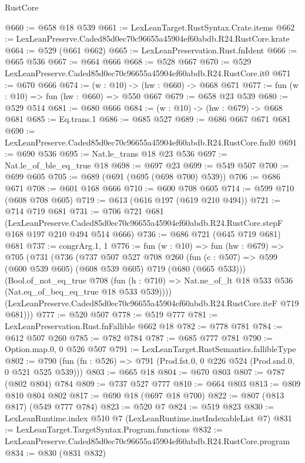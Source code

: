 \begin{lexlean}{RustCore}
\begin{coremodule}
@660 := @658 @18 @539
@661 := LexLeanTarget.RustSyntax.Crate.items
@662 := LexLeanPreserve.Caded85d0ec70c96655a45904ef60abdb.R24.RustCore.krate
@664 := @529 (@661 @662)
@665 := LexLeanPreservation.Rust.fnIdent
@666 := @665 @536
@667 := @664 @666
@668 := @528 @667
@670 := @529 LexLeanPreserve.Caded85d0ec70c96655a45904ef60abdb.R24.RustCore.it0
@671 := @670 @666
@674 := (w : @10) -> (hw : @660) -> @668 @671
@677 := fun (w : @10) => fun (hw : @660) => @550 @667
@679 := @658 @23 @539
@680 := @529 @514
@681 := @680 @666
@684 := (w : @10) -> (hw : @679) -> @668 @681
@685 := Eq.trans.{1}
@686 := @685 @527
@689 := @686 @667 @671 @681
@690 := LexLeanPreserve.Caded85d0ec70c96655a45904ef60abdb.R24.RustCore.fnd0
@691 := @690 @536
@695 := Nat.le_trans @18 @23 @536
@697 := Nat.le_of_ble_eq_true @18
@698 := @697 @23
@699 := @549 @507
@700 := @699 @605
@705 := @689 (@691 (@695 (@698 @700) @539))
@706 := @686 @671
@708 := @601 @168 @666
@710 := @600 @708 @605
@714 := @599 @710 (@608 @708 @605)
@719 := @613 (@616 @197 (@619 @210 @494))
@721 := @714 @719 @681
@731 := @706
    @721
    @681
    (LexLeanPreserve.Caded85d0ec70c96655a45904ef60abdb.R24.RustCore.stepF
      @168
      @197
      @210
      @494
      @514
      @666)
@736 := @686 @721 (@645 @719 @681) @681
@737 := congrArg.{1, 1}
@776 := fun (w : @10) =>
  fun (hw : @679) =>
  @705
    (@731
      (@736
        (@737
          @507
          @527
          @708
          @260
          (fun (c : @507) => @599 (@600 @539 @605) (@608 @539 @605) @719 (@680 (@665 @533)))
          (Bool.of_not_eq_true
            @708
            (fun (h : @710) => Nat.ne_of_lt @18 @533 @536 (Nat.eq_of_beq_eq_true @18 @533 @539))))
        (LexLeanPreserve.Caded85d0ec70c96655a45904ef60abdb.R24.RustCore.iteF @719 @681)))
@777 := @520 @507
@778 := @519 @777
@781 := LexLeanPreservation.Rust.fnFallible @662 @18
@782 := @778 @781
@784 := @612 @507 @260
@785 := @782 @784
@787 := @685 @777 @781
@790 := Option.map.{0, 0} @526 @507
@791 := LexLeanTarget.RustSemantics.fallibleType
@802 := @790 (fun (fn : @526) => @791 (Prod.fst.{0, 0} @226 @524 (Prod.snd.{0, 0} @521 @525 @539)))
@803 := @665 @18
@804 := @670 @803
@807 := @787 (@802 @804) @784
@809 := @737 @527 @777
@810 := @664 @803
@813 := @809 @810 @804 @802
@817 := @690 @18 (@697 @18 @700)
@822 := @807 (@813 @817) (@549 @777 @784)
@823 := @520 @7
@824 := @519 @823
@830 := LexLeanRuntime.index @510 @7 (LexLeanRuntime.instIndexableList @7)
@831 := LexLeanTarget.TargetSyntax.Program.functions
@832 := LexLeanPreserve.Caded85d0ec70c96655a45904ef60abdb.R24.RustCore.program
@834 := @830 (@831 @832)

\end{coremodule}
\end{lexlean}
